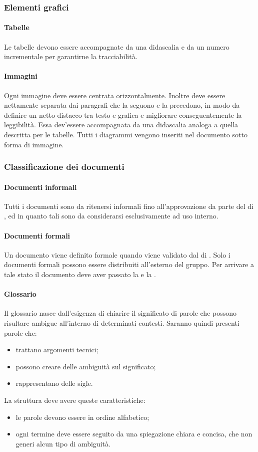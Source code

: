 \subsubsection{Elementi grafici}
 \paragraph{Tabelle} 
 Le tabelle devono essere accompagnate da una didascalia e da un numero incrementale per
garantirne la tracciabilità.
 \paragraph{Immagini}
Ogni immagine deve essere centrata orizzontalmente. Inoltre deve
essere nettamente separata dai paragrafi che la seguono e la precedono, in modo da definire un netto distacco tra testo e grafica e migliorare conseguentemente la leggibilità. Essa dev'essere accompagnata da una didascalia analoga a quella descritta per le tabelle. Tutti i diagrammi
 vengono inseriti nel documento sotto forma di immagine.
\subsubsection{Classificazione dei documenti}
 \paragraph{Documenti informali}
 Tutti i documenti sono da ritenersi informali fino all'approvazione da parte del \RESP{} di , ed in quanto tali sono da considerarsi esclusivamente ad uso interno.
 \paragraph{Documenti formali}
 Un documento viene definito formale quando viene validato dal \RESP{} di . Solo i documenti formali possono essere distribuiti all'esterno del gruppo. Per arrivare a tale stato il
documento deve aver passato la  e la .
 \paragraph{Glossario}
Il glossario nasce dall'esigenza di chiarire il significato di parole che possono risultare ambigue all'interno di determinati contesti. Saranno quindi presenti parole che:
\begin{itemize}
	\item trattano argomenti tecnici;
	\item possono creare delle ambiguità sul significato;
	\item rappresentano delle sigle.
\end{itemize}
La struttura deve avere queste caratteristiche:
\begin{itemize}
	\item le parole devono essere in ordine alfabetico;
	\item ogni termine deve essere seguito da una spiegazione chiara e concisa, che non generi alcun tipo di ambiguità.
\end{itemize}
